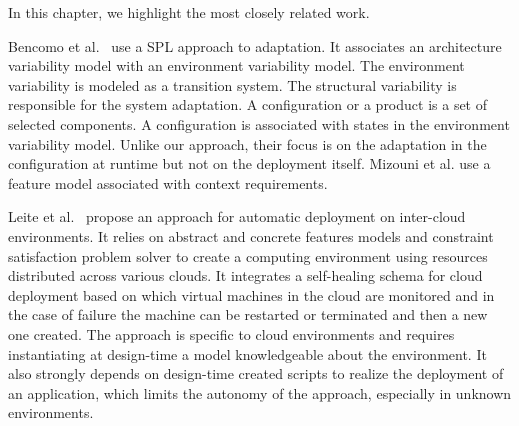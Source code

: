 
In this chapter, we highlight the most closely related work.





Bencomo et al.~\cite{bencomo_dynamically_2008} use a SPL approach to adaptation. It  associates an architecture variability model with an environment variability model. The environment variability is modeled as a transition system. The structural variability is responsible for the system adaptation. A configuration or a product is a set of selected components. A configuration is associated with states in the environment variability model. Unlike our approach, their focus is on the adaptation in the configuration at runtime but not on the deployment itself. Mizouni et al. \citep{mizouni_framework_2014} use a feature model associated with context requirements.

Leite et al.~\cite{ferreira_leite_user_2014} propose an approach for automatic deployment on inter-cloud environments. It relies on abstract and concrete features models and constraint satisfaction problem solver to create a computing environment using resources distributed across various clouds.
It integrates a self-healing schema for cloud deployment based on which virtual machines in the cloud are monitored and in the case of failure the machine can be
restarted or terminated and then a new one created.
The approach is specific to cloud environments and requires instantiating at design-time a model knowledgeable about the environment.
It also strongly depends on design-time created scripts to realize the deployment of an application, which limits the autonomy of the approach, especially in unknown environments.

